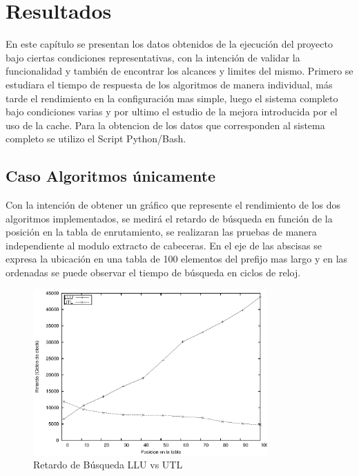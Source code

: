 \chapter{Resultados}

En este capítulo se presentan los datos obtenidos de la ejecución del proyecto bajo ciertas condiciones representativas, con la intención de validar la funcionalidad y también de encontrar los alcances y limites del mismo. Primero se estudiara el tiempo de respuesta de los algoritmos de manera individual, más tarde el rendimiento en la configuración mas simple, luego el sistema completo bajo condiciones varias y por ultimo el estudio de la mejora introducida por el uso de la cache. Para la obtencion de los datos que corresponden al sistema completo se utilizo el Script Python/Bash.


\section{Caso Algoritmos únicamente}

Con la intención de obtener un gráfico que represente el rendimiento de los dos algoritmos implementados, se medirá el retardo de búsqueda en función de la posición en la tabla de enrutamiento, se realizaran las pruebas de manera independiente al modulo extracto de cabeceras. En el eje de las abscisas se expresa la ubicación en una tabla de 100 elementos del prefijo mas largo y en las ordenadas se puede observar el tiempo de búsqueda en ciclos de reloj.

\begin{figure}[h]
  \centering
	\includegraphics[width=0.8\textwidth]{5-resultados/graf/llu-utlsof.eps}
  \caption{Retardo de Búsqueda LLU vs UTL}
  \label{fig}
\end{figure}

